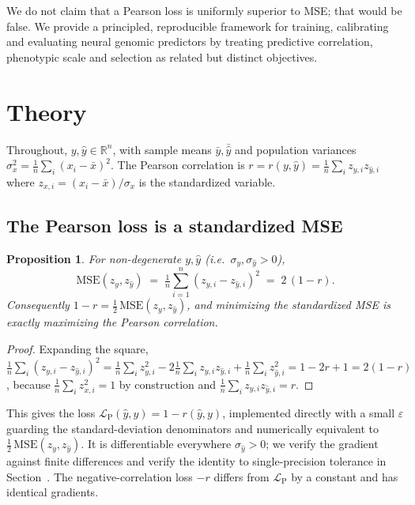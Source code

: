 \documentclass[9pt,twocolumn,twoside,lineno]{gsag3jnl}
\theoremstyle{plain}
\newtheorem{proposition}{Proposition}
\theoremstyle{remark}
\begin{document}
\noindent We do not claim that a Pearson loss is uniformly superior to MSE; that
would be false. We provide a principled, reproducible framework for training,
calibrating and evaluating neural genomic predictors by treating predictive correlation,
phenotypic scale and selection as related but distinct objectives.

\section{Theory}\label{sec:theory}
Throughout, $y,\hat y\in\mathbb{R}^n$, with sample means $\bar y,\bar{\hat y}$ and
population variances $\sigma_x^2 = \tfrac1n\sum_i (x_i-\bar x)^2$. The Pearson
correlation is $r=r(y,\hat y)=\tfrac1n\sum_i z_{y,i} z_{\hat y,i}$ where
$z_{x,i}=(x_i-\bar x)/\sigma_x$ is the standardized variable.

\subsection{The Pearson loss is a standardized MSE}\label{sec:prop1}
\begin{proposition}\label{prop:1}
For non-degenerate $y,\hat y$ (i.e.\ $\sigma_y,\sigma_{\hat y}>0$),
\[
\mathrm{MSE}(z_y,z_{\hat y}) \;=\; \tfrac1n\sum_{i=1}^n (z_{y,i}-z_{\hat y,i})^2
\;=\; 2\,(1-r).
\]
Consequently $1-r = \tfrac12\,\mathrm{MSE}(z_y,z_{\hat y})$, and minimizing the
standardized MSE is exactly maximizing the Pearson correlation.
\end{proposition}
\begin{proof}
Expanding the square,
$\tfrac1n\sum_i (z_{y,i}-z_{\hat y,i})^2
= \tfrac1n\sum_i z_{y,i}^2 - 2\tfrac1n\sum_i z_{y,i} z_{\hat y,i}
+ \tfrac1n\sum_i z_{\hat y,i}^2 = 1 - 2r + 1 = 2(1-r)$,
because $\tfrac1n\sum_i z_{x,i}^2 = 1$ by construction and
$\tfrac1n\sum_i z_{y,i} z_{\hat y,i}=r$.
\end{proof}
This gives the loss $\mathcal{L}_{\mathrm{P}}(\hat y,y) = 1-r(\hat y,y)$,
implemented directly with a small $\varepsilon$ guarding the standard-deviation
denominators and numerically equivalent to
$\tfrac12\,\mathrm{MSE}(z_y,z_{\hat y})$. It is differentiable everywhere
$\sigma_{\hat y}>0$; we verify the gradient against finite differences and verify
the identity to single-precision tolerance in Section~. The
negative-correlation loss $-r$ differs from $\mathcal{L}_{\mathrm{P}}$ by a
constant and has identical gradients.
\end{document}
